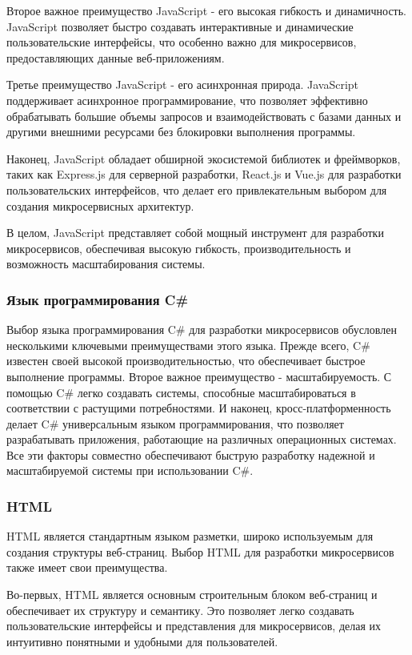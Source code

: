 Второе важное преимущество JavaScript - его высокая гибкость и динамичность. JavaScript позволяет быстро создавать интерактивные и динамические пользовательские интерфейсы, что особенно важно для микросервисов, предоставляющих данные веб-приложениям.

Третье преимущество JavaScript - его асинхронная природа. JavaScript поддерживает асинхронное программирование, что позволяет эффективно обрабатывать большие объемы запросов и взаимодействовать с базами данных и другими внешними ресурсами без блокировки выполнения программы.

Наконец, JavaScript обладает обширной экосистемой библиотек и фреймворков, таких как Express.js для серверной разработки, React.js и Vue.js для разработки пользовательских интерфейсов, что делает его привлекательным выбором для создания микросервисных архитектур.

В целом, JavaScript представляет собой мощный инструмент для разработки микросервисов, обеспечивая высокую гибкость, производительность и возможность масштабирования системы.

\subsubsection{Язык программирования C\#}

Выбор языка программирования C\# для разработки микросервисов обусловлен несколькими ключевыми преимуществами этого языка. Прежде всего, C\# известен своей высокой производительностью, что обеспечивает быстрое выполнение программы. Второе важное преимущество - масштабируемость. С помощью C\# легко создавать системы, способные масштабироваться в соответствии с растущими потребностями. И наконец, кросс-платформенность делает C\# универсальным языком программирования, что позволяет разрабатывать приложения, работающие на различных операционных системах. Все эти факторы совместно обеспечивают быструю разработку надежной и масштабируемой системы при использовании C\#.

\subsubsection{HTML}

HTML является стандартным языком разметки, широко используемым для создания структуры веб-страниц. Выбор HTML для разработки микросервисов также имеет свои преимущества.

Во-первых, HTML является основным строительным блоком веб-страниц и обеспечивает их структуру и семантику. Это позволяет легко создавать пользовательские интерфейсы и представления для микросервисов, делая их интуитивно понятными и удобными для пользователей.

